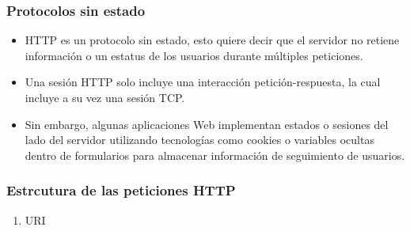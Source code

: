 \documentclass[11pt]{article}
\begin{document}
\subsubsection{Protocolos sin estado}
\label{sec:org8714ab1}
\begin{itemize}
\item HTTP es un protocolo sin estado, esto quiere decir que el servidor no retiene información o un estatus de los usuarios durante múltiples peticiones.
\item Una sesión HTTP solo incluye una interacción petición-respuesta, la cual incluye a su vez una sesión TCP.
\item Sin embargo, algunas aplicaciones Web implementan estados o sesiones del lado del servidor utilizando tecnologías como cookies o variables ocultas dentro de formularios para almacenar información de seguimiento de usuarios.
\end{itemize}
\subsubsection{Estrcutura de las peticiones HTTP}
\label{sec:org8ea66ba}
\begin{enumerate}
\item URI
\label{sec:orgac7c388}
\end{enumerate}
\end{document}
